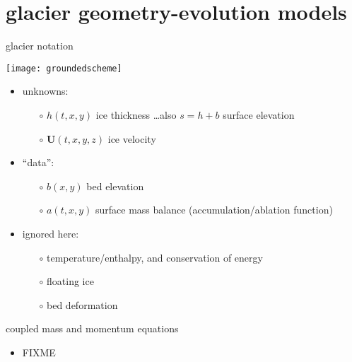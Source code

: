 \documentclass{beamer}
\newcommand\bU{\mathbf{U}}
\begin{document}

\section{glacier geometry-evolution models}

\begin{frame}{glacier notation}

\begin{center}
\texttt{[image: groundedscheme]}
\end{center}

\begin{itemize}
\item unknowns:
  \begin{itemize}
  \item[$\circ$]  $h(t,x,y)$ ice thickness \hfill \dots also $s=h+b$ surface elevation
  \item[$\circ$]  $\bU(t,x,y,z)$ ice velocity
  \end{itemize}
\item ``data'':
  \begin{itemize}
  \item[$\circ$]  $b(x,y)$ bed elevation
  \item[$\circ$]  $a(t,x,y)$ surface mass balance (accumulation/ablation function)
  \end{itemize}
\item ignored here:
  \begin{itemize}
  \item[$\circ$]  temperature/enthalpy, and conservation of energy
  \item[$\circ$]  floating ice
  \item[$\circ$]  bed deformation
  \end{itemize}
\end{itemize}
\end{frame}


\begin{frame}{coupled mass and momentum equations}

\begin{itemize}
\item FIXME
\end{itemize}
\end{frame}
\end{document}
